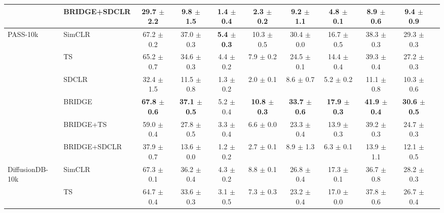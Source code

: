 \begin{table}[t]
\begin{adjustbox}{max width=\textwidth}
\begin{tabular}{l l c c c c c c c c c}
 & BRIDGE+SDCLR & 29.7 {\scriptsize$\pm$ 2.2} & 9.8 {\scriptsize$\pm$ 1.5} & 1.4 {\scriptsize$\pm$ 0.4} & 2.3 {\scriptsize$\pm$ 0.2} & 9.2 {\scriptsize$\pm$ 1.1} & 4.8 {\scriptsize$\pm$ 0.1} & 8.9 {\scriptsize$\pm$ 0.6} & 9.4 {\scriptsize$\pm$ 0.9} \\
\midrule
PASS-10k & SimCLR & 67.2 {\scriptsize$\pm$ 0.2} & 37.0 {\scriptsize$\pm$ 0.3} & \textbf{5.4 {\scriptsize$\pm$ 0.3}} & 10.3 {\scriptsize$\pm$ 0.5} & 30.4 {\scriptsize$\pm$ 0.0} & 16.7 {\scriptsize$\pm$ 0.5} & 38.3 {\scriptsize$\pm$ 0.3} & 29.3 {\scriptsize$\pm$ 0.3} \\
 & TS & 65.2 {\scriptsize$\pm$ 0.7} & 34.6 {\scriptsize$\pm$ 0.3} & 4.4 {\scriptsize$\pm$ 0.2} & 7.9 {\scriptsize$\pm$ 0.2} & 24.5 {\scriptsize$\pm$ 0.1} & 14.4 {\scriptsize$\pm$ 0.4} & 39.3 {\scriptsize$\pm$ 0.4} & 27.2 {\scriptsize$\pm$ 0.3} \\
 & SDCLR & 32.4 {\scriptsize$\pm$ 1.5} & 11.5 {\scriptsize$\pm$ 0.8} & 1.3 {\scriptsize$\pm$ 0.2} & 2.0 {\scriptsize$\pm$ 0.1} & 8.6 {\scriptsize$\pm$ 0.7} & 5.2 {\scriptsize$\pm$ 0.2} & 11.1 {\scriptsize$\pm$ 0.8} & 10.3 {\scriptsize$\pm$ 0.6} \\
 & BRIDGE & \textbf{67.8 {\scriptsize$\pm$ 0.6}} & \textbf{37.1 {\scriptsize$\pm$ 0.5}} & 5.2 {\scriptsize$\pm$ 0.4} & \textbf{10.8 {\scriptsize$\pm$ 0.3}} & \textbf{33.7 {\scriptsize$\pm$ 0.6}} & \textbf{17.9 {\scriptsize$\pm$ 0.3}} & \textbf{41.9 {\scriptsize$\pm$ 0.4}} & \textbf{30.6 {\scriptsize$\pm$ 0.5}} \\
 & BRIDGE+TS & 59.0 {\scriptsize$\pm$ 0.4} & 27.8 {\scriptsize$\pm$ 0.5} & 3.3 {\scriptsize$\pm$ 0.4} & 6.6 {\scriptsize$\pm$ 0.0} & 23.3 {\scriptsize$\pm$ 0.4} & 13.9 {\scriptsize$\pm$ 0.3} & 39.2 {\scriptsize$\pm$ 0.3} & 24.7 {\scriptsize$\pm$ 0.3} \\
 & BRIDGE+SDCLR & 37.9 {\scriptsize$\pm$ 0.7} & 13.6 {\scriptsize$\pm$ 0.0} & 1.2 {\scriptsize$\pm$ 0.2} & 2.7 {\scriptsize$\pm$ 0.1} & 8.9 {\scriptsize$\pm$ 1.3} & 6.3 {\scriptsize$\pm$ 0.1} & 13.9 {\scriptsize$\pm$ 1.1} & 12.1 {\scriptsize$\pm$ 0.5} \\
\midrule
DiffusionDB-10k & SimCLR & 67.3 {\scriptsize$\pm$ 0.1} & 36.2 {\scriptsize$\pm$ 0.4} & 4.3 {\scriptsize$\pm$ 0.2} & 8.8 {\scriptsize$\pm$ 0.1} & 26.8 {\scriptsize$\pm$ 0.4} & 17.3 {\scriptsize$\pm$ 0.1} & 36.7 {\scriptsize$\pm$ 0.8} & 28.2 {\scriptsize$\pm$ 0.3} \\
 & TS & 64.7 {\scriptsize$\pm$ 0.4} & 33.6 {\scriptsize$\pm$ 0.3} & 3.1 {\scriptsize$\pm$ 0.5} & 7.3 {\scriptsize$\pm$ 0.3} & 23.2 {\scriptsize$\pm$ 0.4} & 17.0 {\scriptsize$\pm$ 0.0} & 37.8 {\scriptsize$\pm$ 0.6} & 26.7 {\scriptsize$\pm$ 0.4} \\

\end{tabular}
\end{adjustbox}
\end{table}
